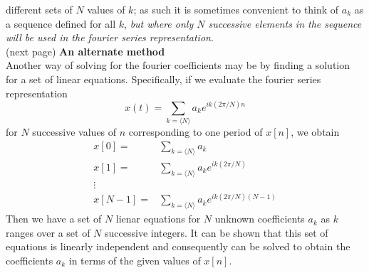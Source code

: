 \documentclass{report}
\begin{document}
different sets of $N$ values of $k$; as such it is sometimes convenient to think of $a_k$ as a sequence defined for all $k$, 
\textit{but where only $N$ successive elements in the sequence will be used in the 
fourier series representation}.\\
(next page)
\newpage
\noindent\textbf{An alternate method}\\
Another way of solving for the fourier coefficients may be by finding a solution for a set of linear equations. Specifically, if we evaluate the fourier series representation
\begin{equation*}
x(t)=\sum_{k=\langle N\rangle}a_ke^{ik(2\pi/N)n}
\end{equation*}
for $N$ successive values of $n$ corresponding to one period of $x[n]$, we obtain
\begin{align*}
x[0]=&\sum_{k=\langle N\rangle}a_k\\
x[1]=&\sum_{k=\langle N\rangle}a_ke^{ik(2\pi/N)}\\
\vdots&\\
x[N-1]=&\sum_{k=\langle N\rangle}a_ke^{ik(2\pi/N)(N-1)}
\end{align*}
Then we have a set of $N$ lienar equations for $N$ unknown coefficients $a_k$ as $k$ ranges over a set of $N$ successive integers. It can be shown that this set of equations
is linearly independent and consequently can be solved to obtain the coefficients $a_k$ in terms of the given values of $x[n]$.
\newpage
\end{document}

